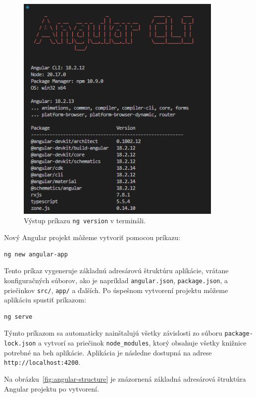 \begin{figure}[H]
  \centering
  \includegraphics[width=10cm]{img/ng-version.png}
  \caption{Výstup príkazu \texttt{ng version} v termináli.}
  \label{fig:ng-version}
\end{figure}

\bigskip
Nový Angular projekt môžeme vytvoriť pomocou príkazu:

\begin{verbatim}
ng new angular-app
\end{verbatim}

Tento príkaz vygeneruje základnú adresárovú štruktúru aplikácie, vrátane konfiguračných súborov, ako je napríklad \texttt{angular.json}, \texttt{package.json}, a priečinkov \texttt{src/}, \texttt{app/} a ďalších. Po úspešnom vytvorení projektu môžeme aplikáciu spustiť príkazom:

\begin{verbatim}
ng serve
\end{verbatim}

Týmto príkazom sa automaticky nainštalujú všetky závislosti zo súboru \texttt{package-lock.json} a vytvorí sa priečinok \texttt{node\_modules}, ktorý obsahuje všetky knižnice potrebné na beh aplikácie.
 Aplikácia je následne dostupná na adrese \texttt{http://localhost:4200}.

Na obrázku~\ref{fig:angular-structure} je znázornená základná adresárová štruktúra Angular projektu po vytvorení.

